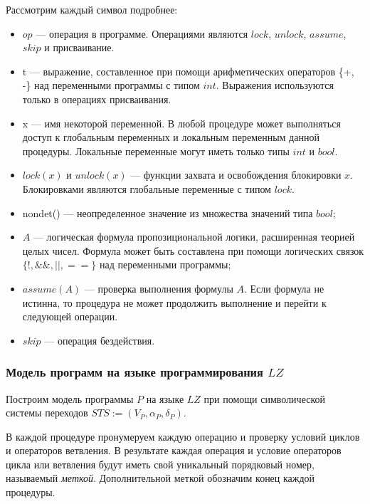 Рассмотрим каждый символ подробнее:
\begin{itemize}
    \item $op$ --- операция в программе. Операциями являются $lock$, $unlock$, $assume$, $skip$ и присваивание.
    \item t --- выражение, составленное при помощи арифметических операторов \{+, -\} над переменными программы с типом $int$. Выражения используются только в операциях присваивания.
    \item x --- имя некоторой переменной. В любой процедуре может выполняться доступ к глобальным переменных и локальным переменным данной процедуры. Локальные переменные могут иметь только типы $int$ и $bool$.
    \item $lock(x)$ и $unlock(x)$ --- функции захвата и освобождения блокировки $x$. Блокировками являются глобальные переменные с типом $lock$.
    \item nondet() --- неопределенное значение из множества значений типа $bool$;
    \item $A$ --- логическая формула пропозициональной логики, расширенная теорией целых чисел. Формула может быть составлена при помощи логических связок $\{!, \&\&, ||, ==\}$ над переменными программы;
    \item $assume(A)$ --- проверка выполнения формулы $A$. Если формула не истинна, то процедура не может продолжить выполнение и перейти к следующей операции.
    \item $skip$ --- операция бездействия.
\end{itemize}

\subsubsection{Модель программ на языке программирования $LZ$}
Построим модель программы $P$ на языке $LZ$ при помощи символической системы переходов $STS \mathbf{:=} (V_P, \alpha_P, \delta_P)$.

В каждой процедуре пронумеруем каждую операцию и проверку условий циклов и операторов ветвления.
В результате каждая операция и условие операторов цикла или ветвления будут иметь свой уникальный порядковый номер, называемый \textit{меткой}.
Дополнительной меткой обозначим конец каждой процедуры.

